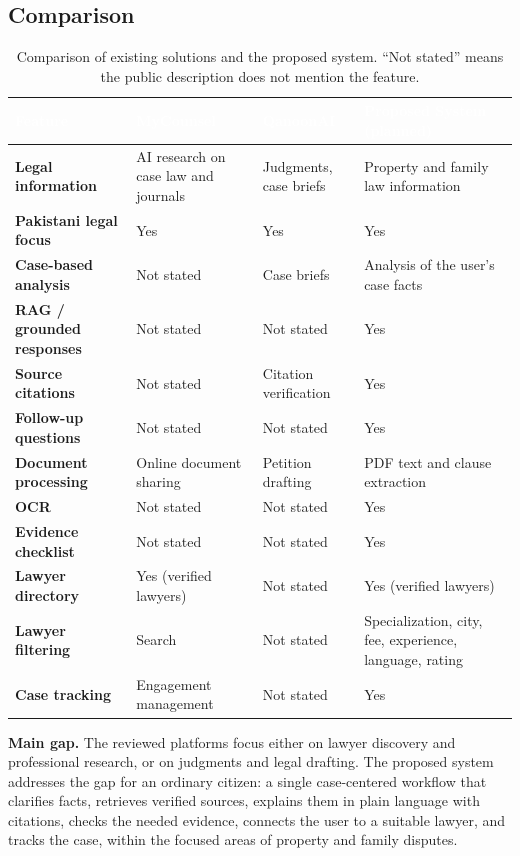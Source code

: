 \documentclass[12pt,a4paper]{report}
\newcommand{\thd}[1]{\textcolor{white}{\textbf{#1}}}
\newcommand{\headrow}{\rowcolor{tablehead}}
\begin{document}
\subsection*{Comparison}
\begin{table}[H]
\centering
\caption[Comparison of existing solutions and the proposed system]{Comparison of existing solutions and the proposed system. ``Not stated'' means the public description does not mention the feature.}
\label{tab:comparison}
\begin{tabular}{|L{3.2cm}|L{3.3cm}|L{3.3cm}|L{3.8cm}|}
\hline
\headrow \thd{Feature} & \thd{MyCounsel} & \thd{QanoonAI} & \thd{Proposed System (planned)} \\ \hline
\textbf{Legal information} & AI research on case law and journals & Judgments, case briefs & Property and family law information \\ \hline
{}\textbf{Pakistani legal focus} & Yes & Yes & Yes \\ \hline
\textbf{Case-based analysis} & Not stated & Case briefs & Analysis of the user's case facts \\ \hline
{}\textbf{RAG / grounded responses} & Not stated & Not stated & Yes \\ \hline
\textbf{Source citations} & Not stated & Citation verification & Yes \\ \hline
{}\textbf{Follow-up questions} & Not stated & Not stated & Yes \\ \hline
\textbf{Document processing} & Online document sharing & Petition drafting & PDF text and clause extraction \\ \hline
{}\textbf{OCR} & Not stated & Not stated & Yes \\ \hline
\textbf{Evidence checklist} & Not stated & Not stated & Yes \\ \hline
{}\textbf{Lawyer directory} & Yes (verified lawyers) & Not stated & Yes (verified lawyers) \\ \hline
\textbf{Lawyer filtering} & Search & Not stated & Specialization, city, fee, experience, language, rating \\ \hline
{}\textbf{Case tracking} & Engagement management & Not stated & Yes \\ \hline
\end{tabular}
\end{table}

\textbf{Main gap.} The reviewed platforms focus either on lawyer discovery and professional research, or on judgments and legal drafting. The proposed system addresses the gap for an ordinary citizen: a single case-centered workflow that clarifies facts, retrieves verified sources, explains them in plain language with citations, checks the needed evidence, connects the user to a suitable lawyer, and tracks the case, within the focused areas of property and family disputes.
\end{document}
